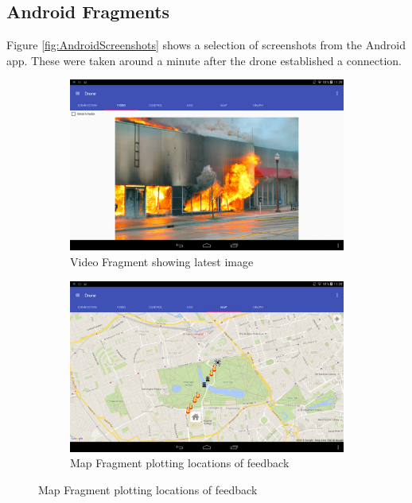 \documentclass{article}
\begin{document}
\subsection{Android Fragments}
Figure \ref{fig:AndroidScreenshots} shows a selection of screenshots from the Android app. These were taken around a minute after the drone established a connection.
\begin{landscape}
\begin{figure}[h]
\caption{Screenshots of the Android App\label{fig:AndroidScreenshots}}
\centering
\begin{subfigure}[b]{.45\linewidth}
\includegraphics[width=\linewidth]{VideoFragment}
\caption{Video Fragment showing latest image}
\end{subfigure}
\begin{subfigure}[b]{.45\linewidth}
\includegraphics[width=\linewidth]{MapFragment}
\caption{Map Fragment plotting locations of feedback}
\end{subfigure}


\end{figure}
\end{landscape}
\end{document}
